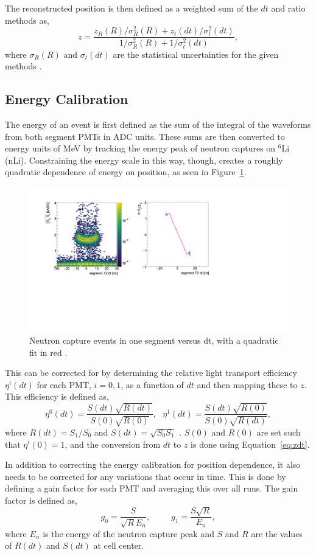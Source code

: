The reconstructed position is then defined as a weighted sum of the $dt$ and ratio methods as, 
\begin{equation}
	z = \frac{z_R(R)/\sigma_R^2(R) + z_t(dt)/\sigma_t^2(dt)}{1/\sigma_R^2(R) + 1/\sigma_t^2(dt)},
\end{equation}
where $\sigma_R(R)$ and $\sigma_t(dt)$ are the statistical uncertainties for the given methods \cite{MM:1131}. 



\subsection{Energy Calibration}

The energy of an event is first defined as the sum of the integral of the waveforms from both segment PMTs in ADC units. 
These sums are then converted to energy units of MeV by tracking the energy peak of neutron captures on $^6$Li (nLi). 
Constraining the energy scale in this way, though, creates a roughly quadratic dependence of energy on position, as seen in Figure~\ref{fig:nlivsdt}.
\begin{figure}[h]
	\centering
	\includegraphics[width=0.5\linewidth]{tex/5-analysis-images/nLi_vs_dt}
	\caption{Neutron capture events in one segment versus dt, with a quadratic fit in red \cite{MM:2314}.}
	\label{fig:nlivsdt}
\end{figure}

This can be corrected for by determining the relative light transport efficiency $\eta^i(dt)$  for each PMT, $i = 0,1$, as a function of $dt$ and then mapping these to $z$.
This efficiency is defined as, 
\begin{equation}
	\eta^0(dt) = \frac{S(dt)\sqrt{R(dt)}}{S(0)\sqrt{R(0)}},~~~ \eta^1(dt) = \frac{S(dt)\sqrt{R(0)}}{S(0)\sqrt{R(dt)}},
\end{equation}
where $R(dt) = S_1/S_0$ and $S(dt) = \sqrt{S_0S_1}$ \cite{MM:2314}. 
$S(0)$ and $R(0)$ are set such that $\eta^i(0) = 1$, and the conversion from $dt$ to $z$ is done using Equation~\ref{eq:zdt}.

In addition to correcting the energy calibration for position dependence, it also needs to be corrected for any variations that occur in time.
This is done by defining a gain factor for each PMT and averaging this over all runs.
The gain factor is defined as,
\begin{equation}
g_0 = \frac{S}{\sqrt{R}E_n}, ~~~~~~~~~~~ g_1 = \frac{S\sqrt{R}}{E_n},
\end{equation}
where $E_n$ is the energy of the neutron capture peak and $S$ and $R$ are the values of $R(dt)$ and $S(dt)$ at cell center.

